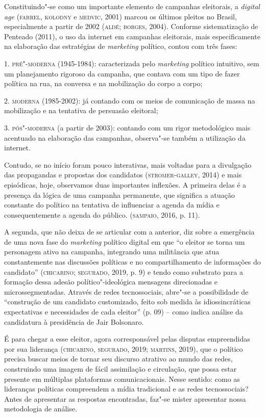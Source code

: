 Constituindo"-se como um importante elemento de campanhas eleitorais, a
\emph{digital age} (\textsc{farrel}, \textsc{kolodny} e \textsc{medvic}, 2001) marcou os últimos
pleitos no Brasil, especialmente a partir de 2002 (\textsc{aldé}; \textsc{borges}, 2004).
Conforme sistematização de Penteado (2011), o uso da internet em
campanhas eleitorais, mais especificamente na elaboração das estratégias
de \emph{marketing} político, contou com três fases:

1. \textsc{pré"-moderna} (1945-1984): caracterizada pelo \emph{marketing} político
intuitivo, sem um planejamento rigoroso da campanha, que contava com um
tipo de fazer política na rua, na conversa e na mobilização do corpo a
corpo;

2. \textsc{moderna} (1985-2002): já contando com os meios de comunicação de massa
na mobilização e na tentativa de persuasão eleitoral;

3. \textsc{pós"-moderna} (a partir de 2003): contando com um rigor metodológico
mais acentuado na elaboração das campanhas, observa"-se também a
utilização da internet.

Contudo, se no início foram pouco interativas, mais voltadas para a
divulgação das propagandas e propostas dos candidatos (\textsc{stromer}-\textsc{galley},
2014) e mais episódicas, hoje, observamos duas importantes inflexões. A
primeira delas é a presença da lógica de uma campanha permanente, que
significa a atuação constante do político na tentativa de influenciar a
agenda da mídia e consequentemente a agenda do público. (\textsc{sampaio}, 2016,
p. 11).

A segunda, que não deixa de se articular com a anterior, diz sobre a
emergência de uma nova fase do \emph{marketing} político digital em que
``o eleitor se torna um personagem ativo na campanha, integrando uma
militância que atua constantemente nas discussões políticas e no
compartilhamento de informações do candidato'' (\textsc{chicarino}; \textsc{segurado},
2019, p. 9) e tendo como substrato para a formação dessa adesão
político"-ideológica mensagens direcionadas e microssegmentadas. Através
de redes tecnossociais, abre"-se a possibilidade de ``construção de um
candidato customizado, feito sob medida às idiossincráticas expectativas
e necessidades de cada eleitor'' (p. 09) -- como indica análise da
candidatura à presidência de Jair Bolsonaro.

É para chegar a esse eleitor, agora corresponsável pelas disputas
empreendidas por sua liderança (\textsc{chicarino}, \textsc{segurado}, 2019; \textsc{martins},
2019), que o político precisa buscar meios de tornar seu discurso
atrativo ao mundo das redes, construindo uma imagem de fácil assimilação
e circulação, que possa estar presente em múltiplas plataformas
comunicacionais. Nesse sentido: como as lideranças políticas compreendem
a mídia tradicional e as redes tecnossociais? Antes de apresentar as
respostas encontradas, faz"-se mister apresentar nossa metodologia de
análise.

